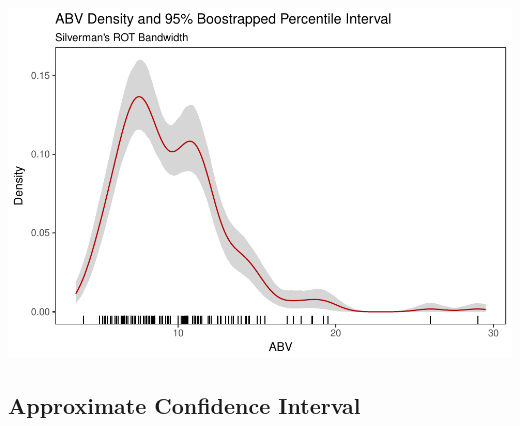 \documentclass[]{article}
\begin{document}
\includegraphics{FinalReport_files/figure-latex/unnamed-chunk-12-2.pdf}

\subsection{Approximate Confidence
Interval}\label{approximate-confidence-interval}
\end{document}
